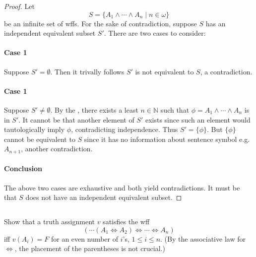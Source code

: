 \documentclass{report}
\begin{document}
  \begin{proof}

    Let $$S = \{A_1 \land \cdots \land A_n \mid n \in \omega\}$$ be an infinite
      set of wffs.
    For the sake of contradiction, suppose $S$ has an independent equivalent
      subset $S'$.
    There are two cases to consider:

    \paragraph{Case 1}%

      Suppose $S' = \emptyset$.
      Then it trivally follows $S'$ is not equivalent to $S$, a contradiction.

    \paragraph{Case 1}%

      Suppose $S' \neq \emptyset$.
      By the , there exists a least
        $n \in \mathbb{N}$ such that $\phi = A_1 \land \cdots \land A_n$ is in
        $S'$.
      It cannot be that another element of $S'$ exists since such an element
        would tautologically imply $\phi$, contradicting independence.
      Thus $S' = \{\phi\}$.
      But $\{\phi\}$ cannot be equivalent to $S$ since it has no information
        about sentence symbol e.g. $A_{n+1}$, another contradiction.

    \paragraph{Conclusion}%

      The above two cases are exhaustive and both yield contradictions.
      It must be that $S$ does not have an independent equivalent subset.

  \end{proof}

\subsection{}%

  Show that a truth assignment $v$ satisfies the wff
    $$(\cdots (A_1 \Leftrightarrow A_2)
      \Leftrightarrow \cdots \Leftrightarrow A_n)$$
    iff $v(A_i) = F$ for an even number of $i$'s, $1 \leq i \leq n$.
  (By the associative law for $\Leftrightarrow$, the placement of the
    parentheses is not crucial.)
\end{document}

